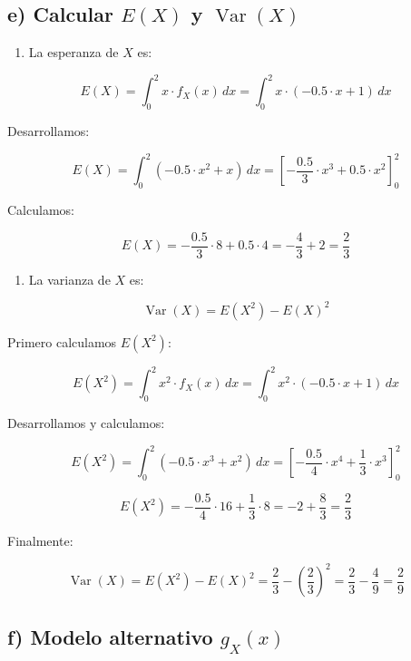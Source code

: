 \documentclass[
]{article}
\providecommand{\tightlist}{%
  \setlength{\itemsep}{0pt}\setlength{\parskip}{0pt}}
\begin{document}
\subsection{\texorpdfstring{e) Calcular \(E(X)\) y \(\operatorname{Var}(X)\)}{e) Calcular E(X) y \textbackslash operatorname\{Var\}(X)}}\label{e-calcular-ex-y-operatornamevarx}

\begin{enumerate}
\def\labelenumi{\arabic{enumi}.}
\tightlist
\item
  La esperanza de \(X\) es:
\end{enumerate}

\[
E(X) = \int_0^2 x \cdot f_X(x) \, dx = \int_0^2 x \cdot (-0.5 \cdot x + 1) \, dx
\]

Desarrollamos:

\[
E(X) = \int_0^2 (-0.5 \cdot x^2 + x) \, dx = \left[-\frac{0.5}{3} \cdot x^3 + 0.5 \cdot x^2\right]_0^2
\]

Calculamos:

\[
E(X) = -\frac{0.5}{3} \cdot 8 + 0.5 \cdot 4 = -\frac{4}{3} + 2 = \frac{2}{3}
\]

\begin{enumerate}
\def\labelenumi{\arabic{enumi}.}
\setcounter{enumi}{1}
\tightlist
\item
  La varianza de \(X\) es:
\end{enumerate}

\[
\operatorname{Var}(X) = E(X^2) - E(X)^2
\]

Primero calculamos \(E(X^2)\):

\[
E(X^2) = \int_0^2 x^2 \cdot f_X(x) \, dx = \int_0^2 x^2 \cdot (-0.5 \cdot x + 1) \, dx
\]

Desarrollamos y calculamos:

\[
E(X^2) = \int_0^2 (-0.5 \cdot x^3 + x^2) \, dx = \left[-\frac{0.5}{4} \cdot x^4 + \frac{1}{3} \cdot x^3\right]_0^2
\]

\[
E(X^2) = -\frac{0.5}{4} \cdot 16 + \frac{1}{3} \cdot 8 = -2 + \frac{8}{3} = \frac{2}{3}
\]

Finalmente:

\[
\operatorname{Var}(X) = E(X^2) - E(X)^2 = \frac{2}{3} - \left(\frac{2}{3}\right)^2 = \frac{2}{3} - \frac{4}{9} = \frac{2}{9}
\]

\subsection{\texorpdfstring{f) Modelo alternativo \(g_X(x)\)}{f) Modelo alternativo g\_X(x)}}\label{f-modelo-alternativo-g_xx}
\end{document}
